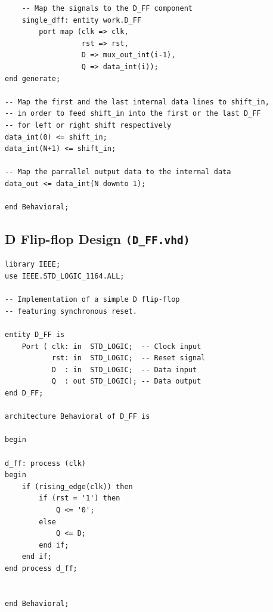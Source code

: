 \documentclass[10pt]{article}
\begin{document}
\begin{verbatim}
    -- Map the signals to the D_FF component 
    single_dff: entity work.D_FF    
        port map (clk => clk, 
                  rst => rst, 
                  D => mux_out_int(i-1), 
                  Q => data_int(i));   
end generate;

-- Map the first and the last internal data lines to shift_in,
-- in order to feed shift_in into the first or the last D_FF 
-- for left or right shift respectively
data_int(0) <= shift_in;
data_int(N+1) <= shift_in;

-- Map the parrallel output data to the internal data
data_out <= data_int(N downto 1);

end Behavioral;
\end{verbatim}
\newpage
\subsection{D Flip-flop Design \texttt{(D\_FF.vhd)}}
\begin{verbatim}
library IEEE;
use IEEE.STD_LOGIC_1164.ALL;

-- Implementation of a simple D flip-flop
-- featuring synchronous reset.

entity D_FF is
    Port ( clk: in  STD_LOGIC;  -- Clock input
           rst: in  STD_LOGIC;  -- Reset signal
           D  : in  STD_LOGIC;  -- Data input
           Q  : out STD_LOGIC); -- Data output
end D_FF;

architecture Behavioral of D_FF is

begin

d_ff: process (clk)
begin
    if (rising_edge(clk)) then
        if (rst = '1') then
            Q <= '0';
        else
            Q <= D;
        end if;
    end if;
end process d_ff;


end Behavioral;
\end{verbatim}
\newpage
\end{document}
